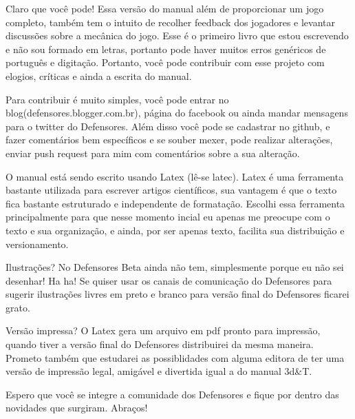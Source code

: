 Claro que você pode! Essa versão do manual além de proporcionar um jogo completo, também tem o intuito de recolher feedback dos jogadores e levantar discussões sobre a mecânica do jogo. Esse é o primeiro livro que estou escrevendo e não sou formado em letras, portanto pode haver muitos erros genéricos de português e digitação. Portanto, você pode contribuir com esse projeto com elogios, críticas e ainda a escrita do manual.

Para contribuir é muito simples, você pode entrar no blog(defensores.blogger.com.br), página do facebook ou ainda mandar mensagens para o twitter do Defensores. Além disso você pode se cadastrar no github, e fazer comentários bem específicos e se souber mexer, pode realizar alterações, enviar push request para mim com comentários sobre a sua alteração.

O manual está sendo escrito usando Latex (lê-se latec). Latex é uma ferramenta bastante utilizada para escrever artigos científicos, sua vantagem é que o texto fica bastante estruturado e independente de formatação. Escolhi essa ferramenta principalmente para que nesse momento incial eu apenas me preocupe com o texto e sua organização, e ainda, por ser apenas texto, facilita sua distribuição e versionamento.

Ilustrações? No Defensores Beta ainda não tem, simplesmente porque eu não sei desenhar! Ha ha! Se quiser usar os canais de comunicação do Defensores para sugerir ilustrações livres em preto e branco para versão final do Defensores ficarei grato. 

Versão impressa? O Latex gera um arquivo em pdf pronto para impressão, quando tiver a versão final do Defensores distribuirei da mesma maneira. Prometo também que estudarei as possiblidades com alguma editora de ter uma versão de impressão legal, amigável e divertida igual a do manual 3d\&T.

Espero que você se integre a comunidade dos Defensores e fique por dentro das novidades que surgiram. Abraços!

